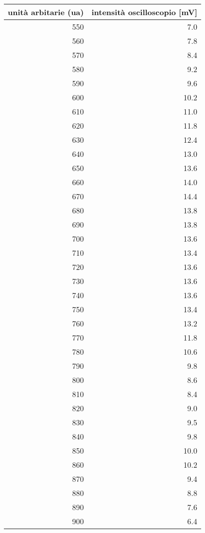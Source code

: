 \begin{tabular}{rr}
\toprule
unità arbitarie (ua) & intensità oscilloscopio [mV]  \\
\midrule
550 & 7.0 \\
560 & 7.8 \\
570 & 8.4 \\
580 & 9.2 \\
590 & 9.6 \\
600 & 10.2 \\
610 & 11.0 \\
620 & 11.8 \\
630 & 12.4 \\
640 & 13.0 \\
650 & 13.6 \\
660 & 14.0 \\
670 & 14.4 \\
680 & 13.8 \\
690 & 13.8 \\
700 & 13.6 \\
710 & 13.4 \\
720 & 13.6 \\
730 & 13.6 \\
740 & 13.6 \\
750 & 13.4 \\
760 & 13.2 \\
770 & 11.8 \\
780 & 10.6 \\
790 & 9.8 \\
800 & 8.6 \\
810 & 8.4 \\
820 & 9.0 \\
830 & 9.5 \\
840 & 9.8 \\
850 & 10.0 \\
860 & 10.2 \\
870 & 9.4 \\
880 & 8.8 \\
890 & 7.6 \\
900 & 6.4 \\
\bottomrule
\end{tabular}
